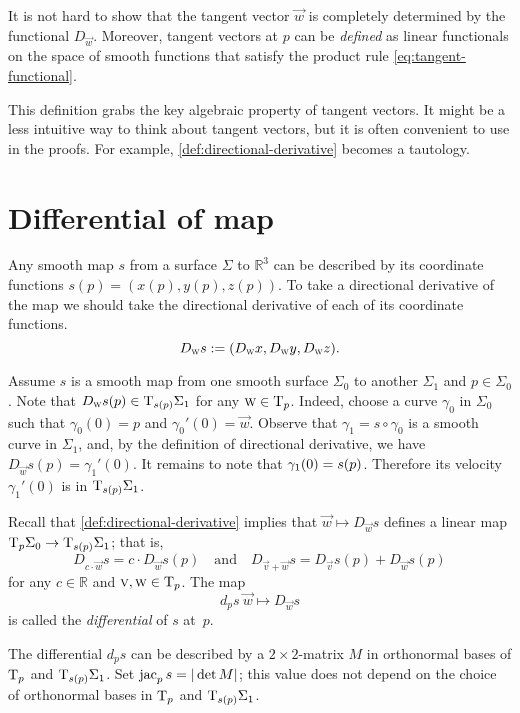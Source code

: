 It is not hard to show that the tangent vector $\vec w$ is completely determined by the functional $D_{\vec w}$.
Moreover, tangent vectors at $p$ can be \emph{defined} as linear functionals on the space of smooth functions
that satisfy the product rule \ref{eq:tangent-functional}.

This definition grabs the key algebraic property of tangent vectors.
It might be a less intuitive way to think about tangent vectors, but it is often convenient to use in the proofs. 
For example, \ref{def:directional-derivative} becomes a tautology.

\section{Differential of map}\label{sec:differential}

Any smooth map $s$ from a surface $\Sigma$ to $\mathbb{R}^3$ can be described by its coordinate functions 
$ s(p)=(x(p),y(p),z(p))$. 
To take a directional derivative of the map we should take the  directional derivative of each of its coordinate functions.
\[D_{\text{\sc{w}}} s\mathrel{:=}(D_{\text{\sc{w}}}x,D_{\text{\sc{w}}}y,D_{\text{\sc{w}}}z).\]

Assume $s$ is a smooth map from one smooth surface $\Sigma_0$ to another $\Sigma_1$ and $p\in \Sigma_0$.
Note that $D_{\text{\sc{w}}} s(p)\in \mathrm{T}_{s(p)}\Sigma_1$ for any $\text{\sc{w}}\in \mathrm{T}_p$.
Indeed, choose a curve $\gamma_0$ in $\Sigma_0$ such that $\gamma_0(0)=p$ and $\gamma_0'(0)=\vec w$.
Observe that $\gamma_1= s\circ \gamma_0$ is a smooth curve in $\Sigma_1$, and, 
by the definition of directional derivative, we have $D_{\vec w} s(p)=\gamma_1'(0)$.
It remains to note that $\gamma_1(0)\z= s(p)$.
Therefore its velocity $\gamma_1'(0)$ is in $\mathrm{T}_{ s(p)}\Sigma_1$.

Recall that \ref{def:directional-derivative} implies that 
$\vec w \mapsto D_{\vec w} s$ defines a linear map $\mathrm{T}_p\Sigma_0\to \mathrm{T}_{ s(p)}\Sigma_1$;
that is,
\[D_{c\cdot \vec w} s=c\cdot D_{\vec w} s(p)
\quad\text{and}\quad D_{\vec v+ \vec w} s=D_{\vec v} s(p)+ D_{\vec w} s(p)\]
for any $c\in\mathbb{R}$ and $\text{\sc{v}}, \text{\sc{w}}\in\mathrm{T}_p$.
The map 
\[d_p s\:\vec w \mapsto D_{\vec w} s\] 
is called the \emph{differential} of $s$ at~$p$.

The differential $d_p s$ can be described by a $2{\times}2$-matrix $M$ in orthonormal bases of $\mathrm{T}_p$ and $\mathrm{T}_{s(p)}\Sigma_1$.
Set $\mathop{\rm jac}\nolimits_p s=|\det M|$; this value  
does not depend on the choice of orthonormal bases in $\mathrm{T}_p$ and $\mathrm{T}_{ s(p)}\Sigma_1$. \label{page:|L|}

